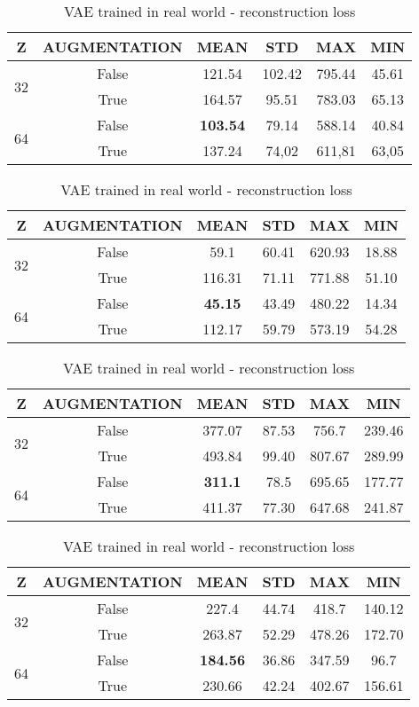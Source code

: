 \begin{table}[h]
	\centering
	\begin{tabular}{|c|c||c|c|c|c|}
		\hline
		Z & AUGMENTATION & MEAN & STD & MAX & MIN \\ \hline
		\multirow{2}{*}{32} & False & 121.54 & 102.42 & 795.44 & 45.61 \\
		& True & 164.57 & 95.51 & 783.03 & 65.13  \\ \hline
		\multirow{2}{*}{64} & False & \textbf{103.54} & 79.14 & 588.14 & 40.84 \\
		& True & 137.24 & 74,02 & 611,81 & 63,05  \\ \hline
	\end{tabular}
	\caption{AE trained in simulation - reconstruction loss}
	\label{tab:aesim}
	
	\begin{tabular}{|c|c||c|c|c|c|}
		\hline
		Z & AUGMENTATION & MEAN & STD & MAX & MIN \\ \hline
		\multirow{2}{*}{32} & False & 59.1 & 60.41 & 620.93 & 18.88 \\
		& True & 116.31 & 71.11 & 771.88 & 51.10  \\ \hline
		\multirow{2}{*}{64} & False & \textbf{45.15} & 43.49 & 480.22 & 14.34 \\
		& True & 112.17 & 59.79 & 573.19 & 54.28  \\ \hline
	\end{tabular}
	\caption{VAE trained in simulation - reconstruction loss}
	\label{tab:vaesim}
	
	\begin{tabular}{|c|c||c|c|c|c|}
		\hline
		Z & AUGMENTATION & MEAN & STD & MAX & MIN \\ \hline
		\multirow{2}{*}{32} & False & 377.07 & 87.53 & 756.7 & 239.46 \\
		& True & 493.84 & 99.40 & 807.67 & 289.99  \\ \hline
		\multirow{2}{*}{64} & False & \textbf{311.1} & 78.5 & 695.65 & 177.77 \\
		& True & 411.37 & 77.30 & 647.68 & 241.87 \\ \hline
	\end{tabular}
	\caption{AE trained in real world - reconstruction loss}
	\label{tab:aereal}
	
	\begin{tabular}{|c|c||c|c|c|c|}
		\hline
		Z & AUGMENTATION & MEAN & STD & MAX & MIN \\ \hline
		\multirow{2}{*}{32} & False & 227.4 & 44.74 & 418.7 & 140.12 \\
		& True & 263.87 & 52.29 & 478.26 & 172.70 \\ \hline
		\multirow{2}{*}{64} & False & \textbf{184.56} & 36.86 & 347.59 & 96.7 \\
		& True & 230.66 & 42.24 & 402.67 & 156.61  \\ \hline
	\end{tabular}
	\caption{VAE trained in real world - reconstruction loss}
	\label{tab:vaereal}
\end{table}

